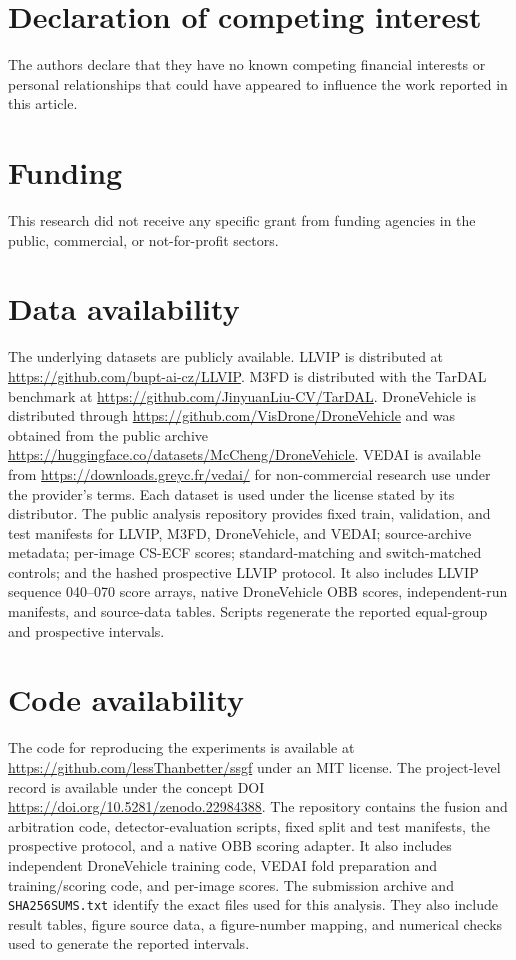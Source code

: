\documentclass[preprint,11pt]{elsarticle}
\begin{document}
\section*{Declaration of competing interest}

The authors declare that they have no known competing financial interests or
personal relationships that could have appeared to influence the work reported
in this article.

\section*{Funding}

This research did not receive any specific grant from funding agencies in the
public, commercial, or not-for-profit sectors.

\section*{Data availability}

The underlying datasets are publicly available. LLVIP is distributed at
\url{https://github.com/bupt-ai-cz/LLVIP}. M3FD is distributed with the TarDAL
benchmark at \url{https://github.com/JinyuanLiu-CV/TarDAL}. DroneVehicle is
distributed through \url{https://github.com/VisDrone/DroneVehicle} and was
obtained from the public archive
\url{https://huggingface.co/datasets/McCheng/DroneVehicle}. VEDAI is available
from \url{https://downloads.greyc.fr/vedai/} for non-commercial research use
under the provider's terms. Each dataset is used under the license stated by
its distributor. The public analysis repository provides fixed train,
validation, and test manifests for LLVIP, M3FD, DroneVehicle, and VEDAI;
source-archive metadata; per-image CS-ECF scores; standard-matching and
switch-matched controls; and the hashed prospective LLVIP protocol. It also
includes LLVIP sequence 040--070 score arrays, native DroneVehicle OBB scores,
independent-run manifests, and source-data tables. Scripts regenerate the
reported equal-group and prospective intervals.

\section*{Code availability}

The code for reproducing the experiments is available at
\url{https://github.com/lessThanbetter/ssgf} under an MIT license. The
project-level record is available under the concept DOI
\url{https://doi.org/10.5281/zenodo.22984388}. The repository contains the
fusion and arbitration code, detector-evaluation scripts, fixed split and test
manifests, the prospective protocol, and a native OBB scoring adapter. It also
includes independent DroneVehicle training code, VEDAI fold preparation and
training/scoring code, and per-image scores. The submission archive and
\texttt{SHA256SUMS.txt} identify the exact files used for this analysis. They
also include result tables, figure source data, a figure-number mapping, and
numerical checks used to generate the reported intervals.
\end{document}
